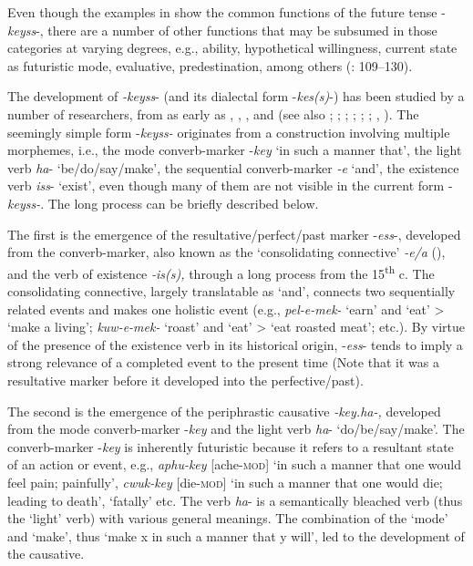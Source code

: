 \documentclass[output=paper,colorlinks,citecolor=brown]{langscibook}
\begin{document}
Even though the examples in  show the common functions of the future tense -\textit{keyss}-, there are a number of other functions that may be subsumed in those categories at varying degrees, e.g., ability, hypothetical willingness, current state as futuristic mode, evaluative, predestination, among others (\cite{Rhee1996}: 109--130).

The development of \textit{-keyss}- (and its dialectal form -\textit{kes(s)}-) has been studied by a number of researchers, from as early as \citet{Underwood1890}, \citet[]{Choe1989}, \citet[]{Park1972}, and \citet[]{Ramstedt1997} (see also \cite{Lee1947}; \cite{Na1953}; \cite{Shin1972}; \cite{Suh1977}; \cite{Gim1981}; \cite{Rhee1996}; \cite{Lee1997}, \citeyear{Lee2006}). The seemingly simple form -\textit{keyss-} originates from a construction involving multiple morphemes, i.e., the mode converb-marker -\textit{key} ‘in such a manner that’, the light verb \textit{ha}- ‘be\slash do\slash say\slash make’, the sequential converb-marker \textit{-e} ‘and’, the existence verb \textit{iss}- ‘exist’, even though many of them are not visible in the current form -\textit{keyss-}. The long process can be briefly described below.

The first is the emergence of the resultative/perfect/past marker -\textit{ess}-, developed from the converb-marker, also known as the ‘consolidating connective’ \textit{-e/a} (\cite{Koo1987}), and the verb of existence \textit{-is(s),} through a long process from the 15\textsuperscript{th} c. The consolidating connective, largely translatable as ‘and’, connects two sequentially related events and makes one holistic event (e.g., \textit{pel-e-mek-} ‘earn’ and ‘eat’ > ‘make a living’; \textit{kuw-e-mek-} ‘roast’ and ‘eat’ > ‘eat roasted meat’; etc.). By virtue of the presence of the existence verb in its historical origin, -\textit{ess}- tends to imply a strong relevance of a completed event to the present time (Note that it was a resultative marker before it developed into the perfective/past). 

The second is the emergence of the periphrastic causative \textit{-key.ha-,} developed from the mode converb-marker -\textit{key} and the light verb \textit{ha}- ‘do/be/say/make’. The converb-marker -\textit{key} is inherently futuristic because it refers to a resultant state of an action or event, e.g., \textit{aphu-key }[ache-\textsc{mod}] ‘in such a manner that one would feel pain; painfully’, \textit{cwuk-key} [die-\textsc{mod}] ‘in such a manner that one would die; leading to death’, `fatally' etc. The verb \textit{ha}- is a semantically bleached verb (thus the ‘light’ verb) with various general meanings. The combination of the ‘mode’ and ‘make’, thus ‘make x in such a manner that y will’, led to the development of the causative. 
\end{document}
